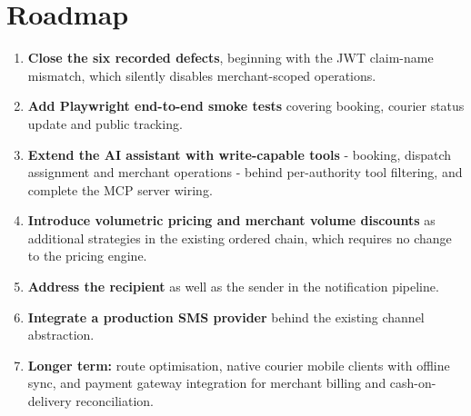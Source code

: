 \documentclass[11pt,a4paper,oneside,openany]{report}
\begin{document}
\section{Roadmap}
\begin{enumerate}[leftmargin=*]
\item \textbf{Close the six recorded defects}, beginning with the JWT claim-name mismatch, which
silently disables merchant-scoped operations.
\item \textbf{Add Playwright end-to-end smoke tests} covering booking, courier status update and
public tracking.
\item \textbf{Extend the AI assistant with write-capable tools} - booking, dispatch assignment and
merchant operations - behind per-authority tool filtering, and complete the MCP server wiring.
\item \textbf{Introduce volumetric pricing and merchant volume discounts} as additional strategies
in the existing ordered chain, which requires no change to the pricing engine.
\item \textbf{Address the recipient} as well as the sender in the notification pipeline.
\item \textbf{Integrate a production SMS provider} behind the existing channel abstraction.
\item \textbf{Longer term:} route optimisation, native courier mobile clients with offline sync,
and payment gateway integration for merchant billing and cash-on-delivery reconciliation.
\end{enumerate}
\end{document}
